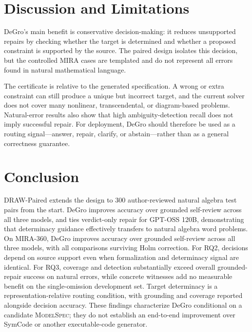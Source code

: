 \documentclass[sigconf,anonymous]{aamas}
\begin{document}
\section{Discussion and Limitations}
DeGro's main benefit is conservative decision-making: it reduces unsupported repairs by checking whether the target is determined and whether a proposed constraint is supported by the source. The paired design isolates this decision, but the controlled MIRA cases are templated and do not represent all errors found in natural mathematical language.

The certificate is relative to the generated specification. A wrong or extra constraint can still produce a unique but incorrect target, and the current solver does not cover many nonlinear, transcendental, or diagram-based problems. Natural-error results also show that high ambiguity-detection recall does not imply successful repair. For deployment, DeGro should therefore be used as a routing signal---answer, repair, clarify, or abstain---rather than as a general correctness guarantee.
\section{Conclusion}
DRAW-Paired extends the design to 300 author-reviewed natural algebra test pairs from the start. DeGro improves accuracy over grounded self-review across all three models, and ties verdict-only repair for GPT-OSS 120B, demonstrating that determinacy guidance effectively transfers to natural algebra word problems.
On MIRA-360, DeGro improves accuracy over grounded self-review across all three models, with all comparisons surviving Holm correction. For RQ2, decisions depend on source support even when formalization and determinacy signal are identical. For RQ3, coverage and detection substantially exceed overall grounded-repair success on natural errors, while concrete witnesses add no measurable benefit on the single-omission development set. Target determinacy is a representation-relative routing condition, with grounding and coverage reported alongside decision accuracy. These findings characterize DeGro conditional on a candidate \textsc{ModelSpec}; they do not establish an end-to-end improvement over SymCode or another executable-code generator.

\clearpage
\balance


\end{document}
